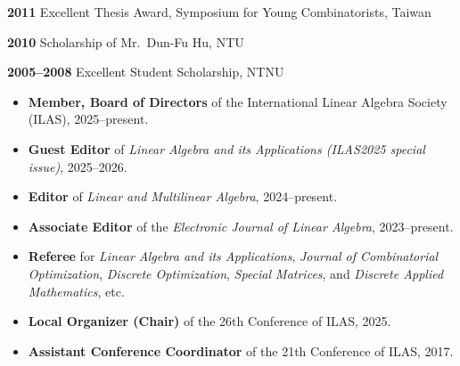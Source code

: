 \documentclass[11pt]{article}
\newenvironment{nobulletlist}{\begin{itemize}[leftmargin=1em,label=]}{\end{itemize}}
\def \heading#1{\vspace{3pt}\large{\sffamily{\textbf{#1}}}\vspace{-8pt}}
\begin{document}
\begin{nobulletlist}
\begin{longcv}\item \textbf{2011} Excellent Thesis Award, Symposium for Young Combinatorists, Taiwan\end{longcv}
\begin{longcv}\item \textbf{2010} Scholarship of Mr.~Dun-Fu Hu, NTU\end{longcv}
\begin{longcv}\item \textbf{2005--2008} Excellent Student Scholarship, NTNU\end{longcv}
\end{nobulletlist}

\begin{longcv}\newpage\end{longcv}
\heading{PROFESSIONAL SERVICES}
\begin{nobulletlist}
\item \textbf{Member, Board of Directors} of the International Linear Algebra Society (ILAS), 2025--present.
\item \textbf{Guest Editor} of \emph{Linear Algebra and its Applications (ILAS2025 special issue)}, 2025--2026.
\item \textbf{Editor} of \emph{Linear and Multilinear Algebra}, 2024--present.
\item \textbf{Associate Editor} of the \emph{Electronic Journal of Linear Algebra}, 2023--present.
\item \textbf{Referee} for \emph{Linear Algebra and its Applications}, \emph{Journal of Combinatorial Optimization}, \emph{Discrete Optimization}, \emph{Special Matrices}, and \emph{Discrete Applied Mathematics}, etc.
\item \textbf{Local Organizer (Chair)} of the 26th Conference of ILAS, 2025.  
\item \textbf{Assistant Conference Coordinator} of the 21th Conference of ILAS, 2017. 
\end{nobulletlist}
\end{document}
